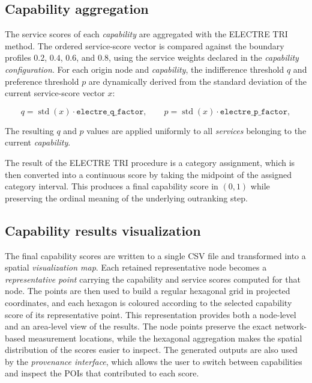 \documentclass{article}
\begin{document}
\subsection{Capability aggregation}
The service scores of each \emph{capability} are aggregated with the
ELECTRE TRI method. The ordered service-score vector is compared against the
boundary profiles \(0.2\), \(0.4\), \(0.6\), and \(0.8\), using the service
weights declared in the \emph{capability configuration}. For each origin node
and \emph{capability}, the indifference threshold \(q\) and preference
threshold \(p\) are dynamically derived from the standard deviation of the
current service-score vector \(x\):

\begin{equation}
    q = \operatorname{std}(x) \cdot \texttt{electre\_q\_factor},
    \qquad
    p = \operatorname{std}(x) \cdot \texttt{electre\_p\_factor},
\end{equation}

\noindent The resulting \(q\) and \(p\) values are applied uniformly to all
\emph{services} belonging to the current \emph{capability}.

The result of the ELECTRE TRI procedure is a category assignment, which is
then converted into a continuous score by taking the midpoint of the assigned
category interval. This produces a final capability score in \((0,1)\) while
preserving the ordinal meaning of the underlying outranking step.

\subsection{Capability results visualization}
The final capability scores are written to a single CSV file and transformed into a
spatial \emph{visualization map}. Each retained representative node becomes a \emph{representative point}
carrying the capability and service scores computed for that node. The points are then used to build a regular hexagonal grid in projected coordinates, and each hexagon is coloured according to the
selected capability score of its representative point.
This representation provides both a node-level and an area-level view of
the results. The node points preserve the exact network-based measurement
locations, while the hexagonal aggregation makes the spatial distribution of
the scores easier to inspect. The generated outputs are also used by the
\emph{provenance interface}, which allows the user to switch between
capabilities and inspect the POIs that contributed to each score.
\end{document}
